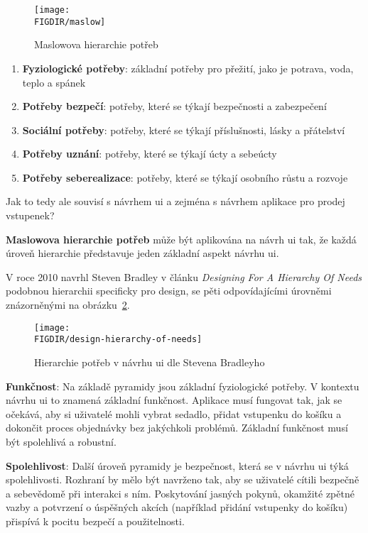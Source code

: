 \begin{figure}[H]
    \centering
    \texttt{[image: \\FIGDIR/maslow]}
    \caption{Maslowova hierarchie potřeb\cite{wiki_potreby}}
    \label{fig:maslow}
\end{figure}

\begin{enumerate}
    \item \textbf{Fyziologické potřeby}: základní potřeby pro přežití, jako je potrava, voda, teplo a spánek
    \item \textbf{Potřeby bezpečí}: potřeby, které se týkají bezpečnosti a zabezpečení
    \item \textbf{Sociální potřeby}: potřeby, které se týkají příslušnosti, lásky a přátelství
    \item \textbf{Potřeby uznání}: potřeby, které se týkají úcty a sebeúcty
    \item \textbf{Potřeby seberealizace}: potřeby, které se týkají osobního růstu a rozvoje
\end{enumerate}

Jak to tedy ale souvisí s návrhem \ac{ui} a zejména s návrhem aplikace pro prodej vstupenek?

\textbf{Maslowova hierarchie potřeb} může být aplikována na návrh \ac{ui} tak, že každá úroveň hierarchie představuje jeden základní aspekt návrhu \ac{ui}.

V roce 2010 navrhl Steven Bradley v článku \textit{Designing For A Hierarchy Of Needs} podobnou hierarchii specificky pro design, se pěti odpovídajícími úrovněmi znázorněnými na obrázku~\ref{fig:design-hierarchy-of-needs}.\cite{bradley_hierarchy_of_needs}

\begin{figure}[H]
    \centering
    \texttt{[image: \\FIGDIR/design-hierarchy-of-needs]}
    \caption{Hierarchie potřeb v návrhu \ac{ui} dle Stevena Bradleyho\cite{bradley_hierarchy_of_needs}}
    \label{fig:design-hierarchy-of-needs}
\end{figure}

\textbf{Funkčnost}: Na základě pyramidy jsou základní fyziologické potřeby.
V kontextu návrhu \ac{ui} to znamená základní funkčnost.
Aplikace musí fungovat tak, jak se očekává, aby si uživatelé mohli vybrat sedadlo, přidat vstupenku do košíku a dokončit proces objednávky bez jakýchkoli problémů.
Základní funkčnost musí být spolehlivá a robustní.

\textbf{Spolehlivost}: Další úroveň pyramidy je bezpečnost, která se v návrhu \ac{ui} týká spolehlivosti.
Rozhraní by mělo být navrženo tak, aby se uživatelé cítili bezpečně a sebevědomě při interakci s ním.
Poskytování jasných pokynů, okamžité zpětné vazby a potvrzení o úspěšných akcích (například přidání vstupenky do košíku) přispívá k pocitu bezpečí a použitelnosti.

